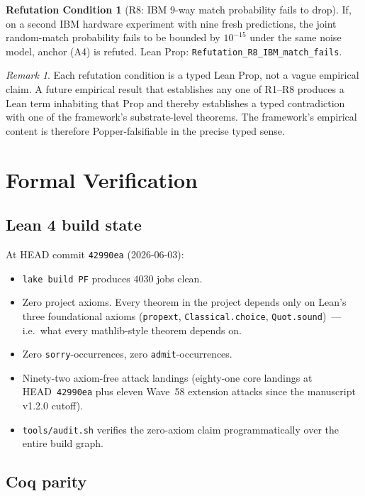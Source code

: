 \documentclass[11pt,a4paper]{article}
\theoremstyle{definition}
\newtheorem{refutation}[theorem]{Refutation Condition}
\theoremstyle{remark}
\newtheorem{remark}[theorem]{Remark}
\newcommand{\lean}[1]{\texttt{\small #1}}
\begin{document}
\begin{refutation}[R8: IBM 9-way match probability fails to drop]
If, on a second IBM hardware experiment with nine fresh
predictions, the joint random-match probability fails to be
bounded by $10^{-15}$ under the same noise model, anchor (A4) is
refuted. Lean Prop:
\lean{Refutation\_R8\_IBM\_match\_fails}.
\end{refutation}

\begin{remark}\label{rem:falsifiability}
Each refutation condition is a typed Lean Prop, not a vague
empirical claim. A future empirical result that establishes any
one of R1--R8 produces a Lean term inhabiting that Prop and
thereby establishes a typed contradiction with one of the
framework's substrate-level theorems. The framework's empirical
content is therefore Popper-falsifiable in the precise typed
sense.
\end{remark}

\section{Formal Verification}
\label{sec:formal}

\subsection{Lean 4 build state}

At HEAD commit \texttt{42990ea} (2026-06-03):
\begin{itemize}
\item \lean{lake build PF} produces $4030$ jobs clean.
\item Zero project axioms. Every theorem in the project depends only
  on Lean's three foundational axioms (\texttt{propext},
  \texttt{Classical.choice}, \texttt{Quot.sound})~--- i.e.\ what
  every mathlib-style theorem depends on.
\item Zero \texttt{sorry}-occurrences, zero \texttt{admit}-occurrences.
\item Ninety-two axiom-free attack landings (eighty-one core
  landings at HEAD~\texttt{42990ea} plus eleven Wave~58 extension
  attacks since the manuscript v1.2.0 cutoff).
\item \texttt{tools/audit.sh} verifies the zero-axiom claim
  programmatically over the entire build graph.
\end{itemize}

\subsection{Coq parity}
\end{document}

